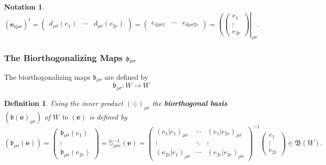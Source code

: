 \documentclass[aps,preprint]{revtex4}
\newtheorem{definition}[theorem]{Definition}
\newtheorem{notation}[theorem]{Notation}
\begin{document}
\begin{notation}
\begin{equation}
\left( \boldsymbol{e}_{d\rho \sigma }\right) ^{t}=\left( 
\begin{array}{ccc}
d_{\rho \sigma }\left( e_{1}\right) & \cdots & d_{\rho \sigma }\left(
e_{2r}\right)%
\end{array}%
\right) =\left( 
\begin{array}{ccc}
e_{d\rho \sigma 1} & \cdots & e_{d\rho \sigma 2r}%
\end{array}%
\right) =\left( \left( 
\begin{array}{c}
e_{1} \\ 
\vdots \\ 
e_{2r}%
\end{array}%
\right) \right\vert _{\rho \sigma }.
\end{equation}
\end{notation}

\subsubsection{\textbf{The Biorthogonalizing Maps }$\mathfrak{b}_{\protect%
\rho \protect\sigma }$ \label{The Biorthogonalizing Map}}

The biorthogonalizing maps $\mathfrak{b}_{\rho \sigma }$ are defined by 
\begin{equation}
\mathfrak{b}_{\rho \sigma }:W\rightarrow W
\end{equation}

\begin{definition}
Using the inner product $\left( \left. \boldsymbol{\cdot }\right\vert 
\boldsymbol{\cdot }\right) _{\rho \sigma }$ the \textbf{biorthogonal basis} $%
\left( \mathfrak{b}\left( \boldsymbol{e}\right) _{\rho \sigma }\right) $ of $%
W$ to $\left( \boldsymbol{e}\right) $ is defined by 
\begin{equation*}
\left( \overset{}{\mathfrak{b}_{\rho \sigma }\left( \boldsymbol{e}\right) }%
\right) =\left( 
\begin{array}{c}
\mathfrak{b}_{\rho \sigma }\left( e_{1}\right) \\ 
\vdots \\ 
\mathfrak{b}_{\rho \sigma }\left( e_{2r}\right)%
\end{array}%
\right) =\mathbb{S}_{\rho \sigma e}^{-1}\left( \mathbf{e}\right) =\left( 
\begin{array}{ccc}
\left( \left. e_{1}\right\vert e_{1}\right) _{\rho \sigma } & \cdots & 
\left( \left. e_{1}\right\vert e_{2r}\right) _{\rho \sigma } \\ 
\vdots & \ddots & \vdots \\ 
\left( \left. e_{2r}\right\vert e_{1}\right) _{\rho \sigma } & \cdots & 
\left( \left. e_{2r}\right\vert e_{2r}\right) _{\rho \sigma }%
\end{array}%
\right) ^{-1}\left( 
\begin{array}{c}
e_{1} \\ 
\vdots \\ 
e_{2r}%
\end{array}%
\right) \in \mathfrak{B}\left( W\right) .
\end{equation*}
\end{definition}
\end{document}
